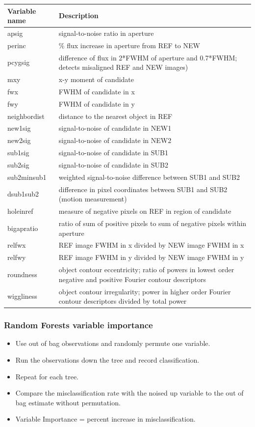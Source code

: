 \documentclass{beamer}
\begin{document}
\begin{frame}
	\begin{tiny}
	\begin{tabular}{lp{3in}}
		\hline
		Variable name & Description \\
		\hline
		apsig & signal-to-noise ratio in aperture \\
		perinc & \% flux increase in aperture from REF to NEW\\
		pcygsig & difference of flux in 2*FWHM of aperture and 0.7*FWHM; detects misaligned REF and NEW
		images)\\
		mxy & x-y moment of candidate\\
		fwx & FWHM of candidate in x\\
		fwy & FWHM of candidate in y\\
		neighbordist & distance to the nearest object in REF\\
		new1sig & signal-to-noise of candidate in NEW1\\
		new2sig & signal-to-noise of candidate in NEW2\\
		sub1sig & signal-to-noise of candidate in SUB1\\
		sub2sig & signal-to-noise of candidate in SUB2\\
		sub2minsub1 & weighted signal-to-noise difference between SUB1 and SUB2\\
		dsub1sub2 & difference in pixel coordinates between SUB1 and SUB2 (motion measurement)\\
		holeinref & measure of negative pixels on REF in region of candidate\\
		bigapratio & ratio of sum of positive pixels to sum of negative pixels within aperture\\
		relfwx & REF image FWHM in x divided by NEW image FWHM in x\\
		relfwy & REF image FWHM in y divided by NEW image FWHM in y\\
		roundness & object contour eccentricity; ratio of powers in lowest order negative and positive Fourier contour		descriptors\\
		wiggliness & object contour irregularity; power in higher order Fourier contour descriptors divided by total power\\
		\hline
	\end{tabular}
	\end{tiny}
\end{frame}

\begin{frame}
	\frametitle{Random Forests variable importance}
		\begin{itemize}
			\item Use out of bag observations and randomly permute one variable.  
			\item Run the observations down the tree and record classification.
			\item Repeat for each tree.
			\item Compare the misclassification rate with the noised up variable to the out of bag estimate without permutation.
			\item Variable Importance = percent increase in misclassification.
		\end{itemize}
\end{frame}
\end{document}
